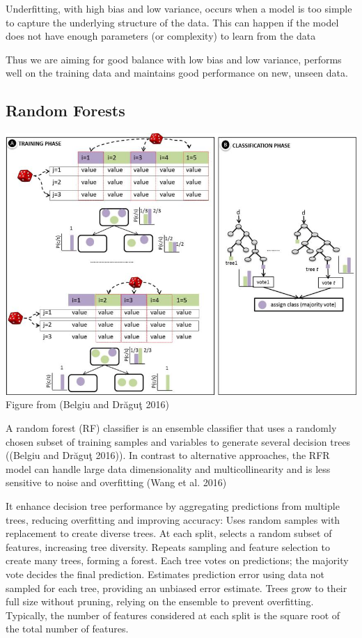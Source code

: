 \documentclass[
  letterpaper,
  DIV=11,
  numbers=noendperiod]{scrreprt}
\begin{document}
Underfitting, with high bias and low variance, occurs when a model is
too simple to capture the underlying structure of the data. This can
happen if the model does not have enough parameters (or complexity) to
learn from the data

Thus we are aiming for good balance with low bias and low variance,
performs well on the training data and maintains good performance on
new, unseen data.

\subsection{Random Forests}\label{random-forests}

\includegraphics{RF.png} Figure from (Belgiu and Drăguţ 2016)

A random forest (RF) classifier is an ensemble classifier that uses a
randomly chosen subset of training samples and variables to generate
several decision trees ((Belgiu and Drăguţ 2016)). In contrast to
alternative approaches, the RFR model can handle large data
dimensionality and multicollinearity and is less sensitive to noise and
overfitting (Wang et al. 2016)

It enhance decision tree performance by aggregating predictions from
multiple trees, reducing overfitting and improving accuracy: Uses random
samples with replacement to create diverse trees. At each split, selects
a random subset of features, increasing tree diversity. Repeats sampling
and feature selection to create many trees, forming a forest. Each tree
votes on predictions; the majority vote decides the final prediction.
Estimates prediction error using data not sampled for each tree,
providing an unbiased error estimate. Trees grow to their full size
without pruning, relying on the ensemble to prevent overfitting.
Typically, the number of features considered at each split is the square
root of the total number of features.
\end{document}
